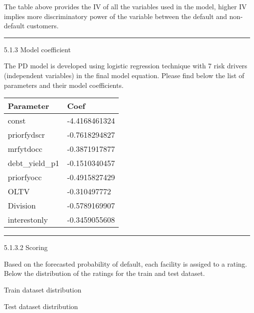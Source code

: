 The table above provides the IV of all the variables used in the model,
higher IV implies more discriminatory power of the variable between the
default and non-default customers.

\begin{center}\rule{0.5\linewidth}{\linethickness}\end{center}

5.1.3 Model coefficient

The PD model is developed using logistic regression technique with 7
risk drivers (independent variables) in the final model equation. Please
find below the list of parameters and their model coefficients.

\begin{longtable}[]{@{}ll@{}}
\toprule
Parameter & Coef\tabularnewline
\midrule
\endhead
const & -4.4168461324\tabularnewline
priorfydscr & -0.7618294827\tabularnewline
mrfytdocc & -0.3871917877\tabularnewline
debt\_yield\_p1 & -0.1510340457\tabularnewline
priorfyocc & -0.4915827429\tabularnewline
OLTV & -0.310497772\tabularnewline
Division & -0.5789169907\tabularnewline
interestonly & -0.3459055608\tabularnewline
\bottomrule
\end{longtable}

\begin{center}\rule{0.5\linewidth}{\linethickness}\end{center}

5.1.3.2 Scoring

Based on the forecasted probability of default, each facility is assiged
to a rating. Below the distribution of the ratings for the train and
test dataset.

Train dataset distribution

Test dataset distribution
